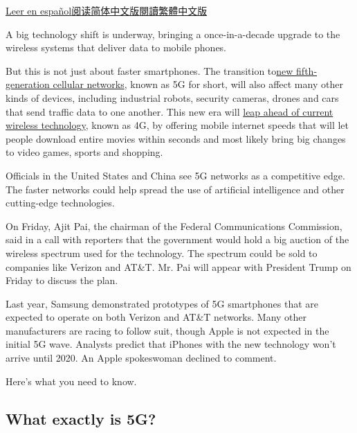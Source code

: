 \href{https://www.nytimes.com/es/2019/01/09/5g-celulares-tecnologia/}{Leer
en
español}\href{https://cn.nytimes.com/technology/20190111/5g-what-you-need-to-know/}{阅读简体中文版}\href{https://cn.nytimes.com/technology/20190111/5g-what-you-need-to-know/zh-hant/}{閱讀繁體中文版}

A big technology shift is underway, bringing a once-in-a-decade upgrade
to the wireless systems that deliver data to mobile phones.

But this is not just about faster smartphones. The transition
to\href{https://www.nytimes.com/2016/02/22/technology/5g-is-a-new-frontier-at-mobile-world-congress.html}{new
fifth-generation cellular networks}, known as 5G for short, will also
affect many other kinds of devices, including industrial robots,
security cameras, drones and cars that send traffic data to one another.
This new era will
\href{https://www.nytimes.com/2018/03/06/technology/companies-countries-battling-5g.html}{leap
ahead of current wireless technology}, known as 4G, by offering mobile
internet speeds that will let people download entire movies within
seconds and most likely bring big changes to video games, sports and
shopping.

Officials in the United States and China see 5G networks as a
competitive edge. The faster networks could help spread the use of
artificial intelligence and other cutting-edge technologies.

On Friday, Ajit Pai, the chairman of the Federal Communications
Commission, said in a call with reporters that the government would hold
a big auction of the wireless spectrum used for the technology. The
spectrum could be sold to companies like Verizon and AT\&T. Mr. Pai will
appear with President Trump on Friday to discuss the plan.

Last year, Samsung demonstrated prototypes of 5G smartphones that are
expected to operate on both Verizon and AT\&T networks. Many other
manufacturers are racing to follow suit, though Apple is not expected in
the initial 5G wave. Analysts predict that iPhones with the new
technology won't arrive until 2020. An Apple spokeswoman declined to
comment.

Here's what you need to know.

\hypertarget{what-exactly-is-5g}{%
\subsection{What exactly is 5G?}\label{what-exactly-is-5g}}

